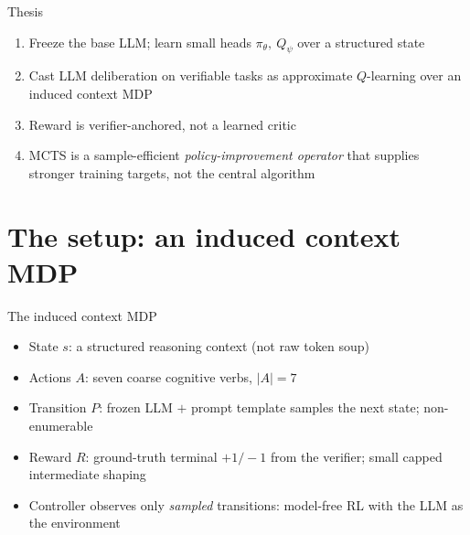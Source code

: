 \documentclass[aspectratio=169]{beamer}
\newcommand{\pitheta}{\pi_\theta}
\newcommand{\Qpsi}{Q_\psi}
\begin{document}
\begin{frame}{Thesis}
  \begin{enumerate}
    \item Freeze the base LLM; learn small heads $\pitheta,\ \Qpsi$ over a structured state
    \item Cast LLM deliberation on verifiable tasks as \alert{approximate $Q$-learning over an induced context MDP}
    \item Reward is verifier-anchored, not a learned critic
    \item MCTS is a sample-efficient \emph{policy-improvement operator} that supplies
          stronger training targets, \alert{not} the central algorithm
  \end{enumerate}
\end{frame}

\section{The setup: an induced context MDP}

\begin{frame}{The induced context MDP}
  \begin{itemize}
    \item State $s$: a structured reasoning context (not raw token soup)
    \item Actions $A$: seven coarse cognitive verbs, $|A| = 7$
    \item Transition $P$: frozen LLM $+$ prompt template samples the next state; non-enumerable
    \item Reward $R$: ground-truth terminal $+1/-1$ from the verifier; small capped intermediate shaping
    \item Controller observes only \emph{sampled} transitions: model-free RL with the LLM as the environment
  \end{itemize}
\end{frame}
\end{document}
